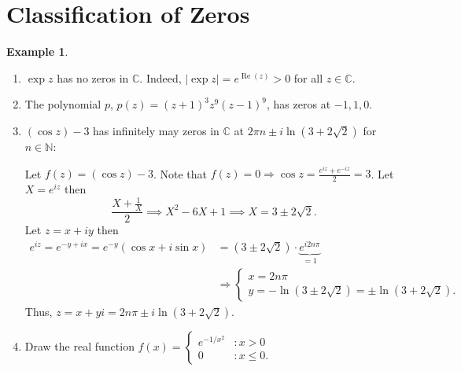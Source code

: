 \documentclass[12pt,openany]{book}
\theoremstyle{definition}
\newtheorem{example}{Example}[section]
\newcommand{\N}{\mathbb{N}}
\newcommand{\C}{\mathbb{C}}
\newcommand{\of}[1]{\left( #1 \right)}
\newcommand{\abs}[1]{\left\lvert #1 \right\rvert}
\renewcommand{\Re}{\operatorname{Re}}
\begin{document}
	\section{Classification of Zeros}
	\begin{example}
		\ \begin{enumerate}[(1)]
			\item $\exp z$ has no zeros in $\C$. Indeed, $\abs{\exp z}=e^{\Re(z)}>0$ for all $z\in\C$.
			\item The polynomial $p$, $p(z)=(z+1)^3z^9(z-1)^9$, has zeros at $-1, 1, 0$.
			\item $(\cos z)-3$ has infinitely may zeros in $\C$ at $2\pi n\pm i\ln(3+2\sqrt{2})$ for $n\in\N$:
			
			Let $f(z)=\of{\cos z}-3$. Note that $f(z)=0\Rightarrow\cos z=\frac{e^{iz}+e^{-iz}}{2}=3$. Let $X=e^{iz}$ then \[
			\frac{X+\frac{1}{X}}{2}\implies X^2-6X+1\implies X=3\pm 2\sqrt{2}.
			\] Let $z=x+iy$ then \begin{align*}
			e^{iz}=e^{-y+ix}=e^{-y}\of{\cos x+i\sin x}
			&=(3\pm2\sqrt{2})\cdot \underbrace{e^{i2n\pi}}_{=1}\\
			&\Rightarrow\begin{cases}
			x = 2n\pi\\
			y = -\ln(3\pm 2\sqrt{2})=\pm\ln(3+ 2\sqrt{2}).
			\end{cases}
			\end{align*} Thus, $z=x+yi=2n\pi\pm i\ln(3+2\sqrt{2})$.
			\item 
			Draw the real function $f(x)=\begin{cases}
			e^{-1/x^2} &:x>0\\
			0 &:x\leq 0.
			\end{cases}$
			
			\begin{center}
			\end{center}
		\end{enumerate}
	\end{example}
\end{document}
